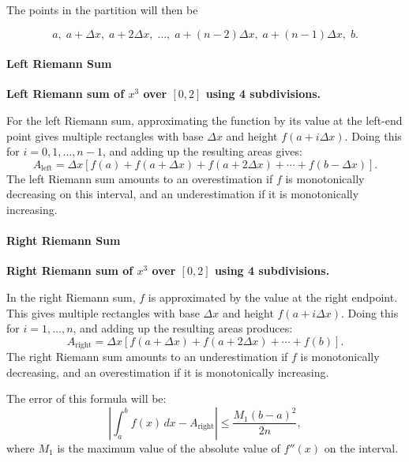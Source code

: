 The points in the partition will then be



$$a, \; a + \Delta x, \; a + 2\Delta x, \; \ldots, \; a + (n-2)\Delta x, \; a + (n-1)\Delta x, \; b.$$



\paragraph{Left Riemann Sum}




\textbf{Left Riemann sum of $x^3$ over $[0,2]$ using 4 subdivisions.}



For the left Riemann sum, approximating the function by its value at the left-end point gives multiple rectangles with base $\Delta x$ and height $f(a + i\Delta x)$. Doing this for $i = 0, 1, \dots, n-1$, and adding up the resulting areas gives:
$$
A_\text{left} = \Delta x \left[f(a) + f(a + \Delta x) + f(a + 2\Delta x) + \cdots + f(b - \Delta x)\right].
$$
The left Riemann sum amounts to an overestimation if $f$ is monotonically decreasing on this interval, and an underestimation if it is monotonically increasing.



\paragraph{Right Riemann Sum}




\textbf{Right Riemann sum of $x^3$ over $[0,2]$ using 4 subdivisions.}



In the right Riemann sum, $f$ is approximated by the value at the right endpoint. This gives multiple rectangles with base $\Delta x$ and height $f(a + i\Delta x)$. Doing this for $i = 1, \dots, n$, and adding up the resulting areas produces:
$$
A_\text{right} = \Delta x \left[f(a + \Delta x) + f(a + 2\Delta x) + \cdots + f(b)\right].
$$
The right Riemann sum amounts to an underestimation if $f$ is monotonically decreasing, and an overestimation if it is monotonically increasing.



The error of this formula will be:
$$
\left|\int_a^b f(x) \, dx - A_\text{right}\right| \le \frac{M_1 (b-a)^2}{2n},
$$
where $M_1$ is the maximum value of the absolute value of $f''(x)$ on the interval.



